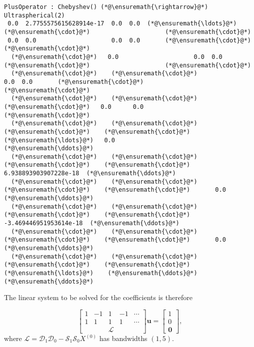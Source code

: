 \documentclass[12pt,a4paper]{article}
\begin{document}
\begin{lstlisting}
PlusOperator : Chebyshev() (*@\ensuremath{\rightarrow}@*) Ultraspherical(2)
 0.0  2.7755575615628914e-17  0.0  0.0  (*@\ensuremath{\ldots}@*)    (*@\ensuremath{\cdot}@*)                     (*@\ensuremath{\cdot}@*)
 0.0  0.0                     0.0  0.0       (*@\ensuremath{\cdot}@*)                     (*@\ensuremath{\cdot}@*)
  (*@\ensuremath{\cdot}@*)   0.0                     0.0  0.0       (*@\ensuremath{\cdot}@*)                     (*@\ensuremath{\cdot}@*)
  (*@\ensuremath{\cdot}@*)    (*@\ensuremath{\cdot}@*)                      0.0  0.0       (*@\ensuremath{\cdot}@*)                     (*@\ensuremath{\cdot}@*)
  (*@\ensuremath{\cdot}@*)    (*@\ensuremath{\cdot}@*)                       (*@\ensuremath{\cdot}@*)   0.0      0.0                    (*@\ensuremath{\cdot}@*)
  (*@\ensuremath{\cdot}@*)    (*@\ensuremath{\cdot}@*)                       (*@\ensuremath{\cdot}@*)    (*@\ensuremath{\cdot}@*)   (*@\ensuremath{\ldots}@*)   0.0                    (*@\ensuremath{\ddots}@*)
  (*@\ensuremath{\cdot}@*)    (*@\ensuremath{\cdot}@*)                       (*@\ensuremath{\cdot}@*)    (*@\ensuremath{\cdot}@*)       6.938893903907228e-18  (*@\ensuremath{\ddots}@*)
  (*@\ensuremath{\cdot}@*)    (*@\ensuremath{\cdot}@*)                       (*@\ensuremath{\cdot}@*)    (*@\ensuremath{\cdot}@*)       0.0                    (*@\ensuremath{\ddots}@*)
  (*@\ensuremath{\cdot}@*)    (*@\ensuremath{\cdot}@*)                       (*@\ensuremath{\cdot}@*)    (*@\ensuremath{\cdot}@*)      -3.469446951953614e-18  (*@\ensuremath{\ddots}@*)
  (*@\ensuremath{\cdot}@*)    (*@\ensuremath{\cdot}@*)                       (*@\ensuremath{\cdot}@*)    (*@\ensuremath{\cdot}@*)       0.0                    (*@\ensuremath{\ddots}@*)
  (*@\ensuremath{\cdot}@*)    (*@\ensuremath{\cdot}@*)                       (*@\ensuremath{\cdot}@*)    (*@\ensuremath{\cdot}@*)   (*@\ensuremath{\ldots}@*)    (*@\ensuremath{\ddots}@*)                     (*@\ensuremath{\ddots}@*)
\end{lstlisting}


The linear system to be solved for the coefficients is therefore

\[
\begin{bmatrix}
1 & -1 &  1 & -1 & \cdots  \\
1 & 1  &  1 & 1  & \cdots \\
& &\mathcal{L} & &
\end{bmatrix}\mathbf{u} = \begin{bmatrix} 1  \\
0 \\
\mathbf{0}
\end{bmatrix},
\]
where $\mathcal{L} = \mathcal{D}_1\mathcal{D}_0  - \mathcal{S}_1\mathcal{S}_0X^{(0)} $ has bandwidths $(1,5)$.
\end{document}
